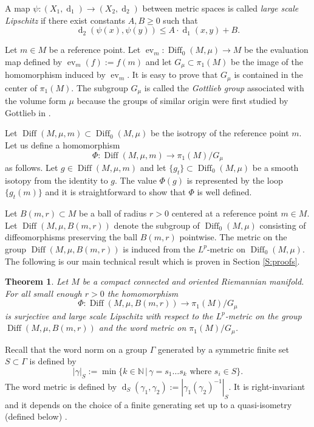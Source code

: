 \documentclass[a4paper,12pt]{amsart}
\def\Diff{\operatorname{Diff}}
\def\g{\gamma}
\newtheorem{thm}{Theorem}[section]
\theoremstyle{definition}
\def\OP{\operatorname}
\begin{document}
A map $\psi\colon (X_1,\OP{d}_1)\to (X_2,\OP{d}_2)$ between metric spaces
is called {\em large scale Lipschitz} \cite[Remark 1.9]{Roe}
if there exist constants
$A,B\geq 0$ such that
$$
\OP{d}_2(\psi(x),\psi(y))\leq A\cdot \OP{d}_1(x,y)+B.
$$

Let $m\in M$ be a reference point.
Let $\OP{ev}_m\colon \Diff_0(M,\mu)\to M$ be the evaluation map
defined by $\OP{ev}_m(f):=f(m)$ and let $G_{\mu}\subset \pi_1(M)$ be
the image of the homomorphism induced by $\OP{ev}_m$.  It is easy to
prove that $G_{\mu}$ is contained in the center of $\pi_1(M)$.  The
subgroup $G_{\mu}$ is called the {\em Gottlieb group} associated with
the volume form $\mu$ because the groups of similar origin were first
studied by Gottlieb in \cite{Go}.

Let $\Diff(M,\mu,m)\subset \Diff_0(M,\mu)$ be the isotropy of
the reference point $m$. Let us define a homomorphism
$$
\Phi\colon \Diff(M,\mu,m)\to \pi_1(M)/G_\mu
$$ as follows. Let $g\in \Diff(M,\mu,m)$ and let $\{g_t\}\subset
\Diff_0(M,\mu)$ be a smooth isotopy from the identity to $g$. The
value $\Phi(g)$ is represented by the loop $\{g_t(m)\}$ and it is
straightforward to show that $\Phi$ is well defined.

Let $B(m,r)\subset M$ be a ball of radius $r>0$ centered at
a reference point $m\in M$. Let $\Diff(M,\mu,B(m,r))$ denote the
subgroup of $\Diff_0(M,\mu)$ consisting of diffeomorphisms
preserving the ball $B(m,r)$ pointwise. The metric on the group $\Diff(M,\mu,B(m,r))$ is induced from the $L^p$-metric on $\Diff_0(M,\mu)$.
The following is our main technical result which is
proven in Section \ref{S:proofs}.

\begin{thm}\label{T:lsl}
Let $M$ be a compact connected and oriented Riemannian manifold.
For all small enough $r>0$ the homomorphism
$$
\Phi\colon \Diff(M,\mu,B(m,r)) \to \pi_1(M)/G_\mu
$$
is surjective and large scale Lipschitz with respect to the
$L^p$-metric on the group $\Diff(M,\mu,B(m,r))$ and the
word metric on $\pi_1(M)/G_{\mu}$.
\end{thm}

Recall that the word norm on a group $\Gamma$ generated
by a symmetric finite set $S\subset \Gamma$ is defined by
$$
|\g|_S:=
\min\{k\in \mathbb N\,|\,\g=s_1\ldots s_k \text{ where }s_i\in S\}.
$$
The word metric is defined by $\OP{d}_S(\g_1,\g_2):=|\g_1(\g_2)^{-1}|_S$.
It is right-invariant and it depends on the choice of a finite
generating set up to a quasi-isometry (defined below)
\cite[Example 8.17]{BH}.
\end{document}
